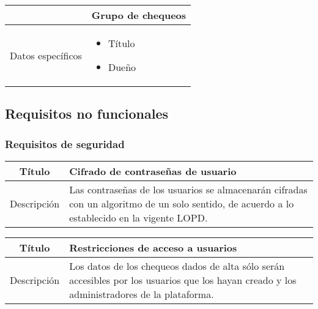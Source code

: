 \begin{center}
  
  \begin{tabularx}{\textwidth}{|l|X|}
    \hline

    & Grupo de chequeos \\

    \hline
    Datos específicos &

    \begin{itemize}
      \item Título
      \item Dueño
    \end{itemize}
    \\
    
    \hline
    
  \end{tabularx}
\end{center}

\FloatBarrier
\subsection{Requisitos no funcionales}

\subsubsection{Requisitos de seguridad}

\begin{center}
  
  \begin{tabularx}{\textwidth}{|c|X|}
    \hline
    Título & Cifrado de contraseñas de usuario \\

    \hline

    Descripción & Las contraseñas de los usuarios se almacenarán cifradas con un
    algoritmo de un solo sentido, de acuerdo a lo establecido en la vigente \ac{LOPD}. \\


    \hline
  \end{tabularx}
\end{center}

\begin{center}
  
  \begin{tabularx}{\textwidth}{|c|X|}
    \hline
    Título & Restricciones de acceso a usuarios \\

    \hline

    Descripción & Los datos de los chequeos dados de alta sólo serán accesibles
    por los usuarios que los hayan creado y los administradores de la plataforma. \\


    \hline
  \end{tabularx}
\end{center}

